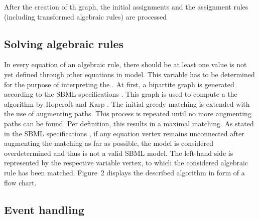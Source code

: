 \documentclass[10pt]{bmc_article}
\newenvironment{bmcformat}{\begin{raggedright}\baselineskip20pt\sloppy\setboolean{publ}{false}}{\end{raggedright}\baselineskip20pt\sloppy}
\begin{document}
\begin{bmcformat}
After the creation of th graph, the initial
assignments and the assignment rules (including transformed algebraic rules) are
processed 


\subsection*{Solving algebraic rules}
In every equation of an algebraic rule, there should be at least one  value is not yet defined through other equations in  model.
This variable has to be determined for the purpose of interpreting the . 
At first, a bipartite graph is generated according to the \acs{SBML} specifications \cite{Finney2006, Hucka2007, Hucka2008, Hucka2010a}.
This graph is used to compute a  the algorithm by Hopcroft
and Karp \cite{hopcroft1973n}.
The initial greedy matching is extended with the use of augmenting paths.
This process is repeated until no more augmenting paths can be found.
Per definition, this results in a maximal matching. 
As stated in the \acs{SBML} specifications \cite{Finney2006, Hucka2007, Hucka2008, Hucka2010a},
if any equation vertex remains unconnected after augmenting the matching as far as possible, the model is considered overdetermined and thus is not a valid \acs{SBML} model.
The left-hand side is represented by the respective variable vertex, to which the considered algebraic rule has been matched.
Figure~2 displays the described algorithm in  form of a flow chart.

\subsection*{Event handling}


\end{bmcformat}
\end{document}
